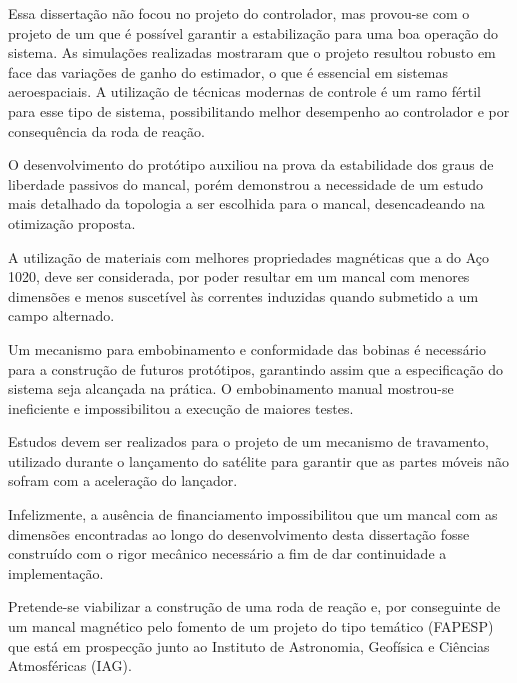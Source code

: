 Essa dissertação não focou no projeto do controlador, mas provou-se com o projeto de um que é possível garantir a estabilização para uma boa operação do sistema. As simulações realizadas mostraram que o projeto resultou robusto em face das variações de ganho do estimador, o que é essencial em sistemas aeroespaciais. A utilização de técnicas modernas de controle é um ramo fértil para esse tipo de sistema, possibilitando melhor desempenho ao controlador e por consequência da roda de reação. 

O desenvolvimento do protótipo auxiliou na prova da estabilidade dos graus de liberdade passivos do mancal, porém demonstrou a necessidade de um estudo mais detalhado da topologia a ser escolhida para o mancal, desencadeando na otimização proposta.

A utilização de materiais com melhores propriedades magnéticas que a do Aço 1020, deve ser considerada, por poder resultar em um mancal com menores dimensões e menos suscetível às correntes induzidas \citep{Ravaud2009} quando submetido a um campo alternado.

Um mecanismo para embobinamento e conformidade das bobinas é necessário para a construção de futuros protótipos, garantindo assim que a especificação do sistema seja alcançada na prática. O embobinamento manual mostrou-se ineficiente e impossibilitou a execução de maiores testes. 

Estudos devem ser realizados para o projeto de um mecanismo de travamento, utilizado durante o lançamento do satélite para garantir que as partes móveis não sofram com a aceleração do lançador.

Infelizmente, a ausência de financiamento impossibilitou que um mancal com as dimensões encontradas ao longo do desenvolvimento desta dissertação fosse construído com o rigor mecânico necessário a fim de dar continuidade a implementação. 

Pretende-se viabilizar a construção de uma roda de reação e, por conseguinte de um mancal magnético pelo fomento de um projeto do tipo temático (FAPESP) que está em prospecção junto ao Instituto de Astronomia, Geofísica e Ciências Atmosféricas (IAG).




